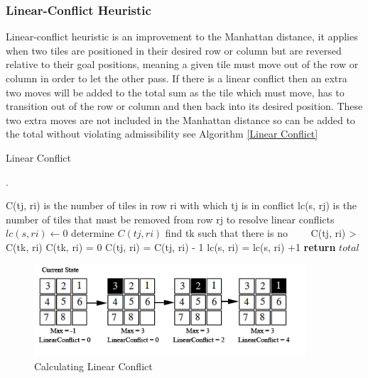 \documentclass[final]{cmpreport}
\begin{document}
\subsubsection{Linear-Conflict Heuristic}
Linear-conflict heuristic is an improvement to the Manhattan distance, it applies when two tiles are positioned in their desired row or column but are reversed relative to
their goal positions, meaning a given tile must move out of the row or column in order to let the other pass. If there is a linear conflict then an extra two moves will be added to the total sum as the tile which must move, has to transition out of the row or column and then back into its desired position. These two extra moves are not included in the Manhattan distance so can be added to the total without violating admissibility see Algorithm \ref{Linear Conflict} 


\begin{algorithm}
	\caption{Linear Conflict}\label{Linear Conflict}\cite{hansson1992criticizing}.
	\begin{algorithmic}[1]
		\State C(tj, ri) is the number of tiles in row ri with which tj is in conflict
		\State lc(s, rj) is the number of tiles that must be removed from row rj to resolve linear conflicts
			
			\State $lc(s, ri)\gets 0$
				\State determine $C(tj, ri)$
					\State find tk such that there is no
					\State \ \ \ \  C(tj, ri) > C(tk, ri)
					\State C(tk, ri) = 0 
						\State C(tj, ri) = C(tj, ri) - 1 
					\EndFor
					\State lc(s, ri) = lc(s, ri) +1	
				\EndWhile
			\EndFor
		\EndFor
		\State \textbf{return} $total$
		\EndProcedure
	\end{algorithmic}
\end{algorithm}


\begin{figure}[ht]
	\centering
	\includegraphics[width=0.9\textwidth]{linear}
	\captionsetup{justification=centering}
	\caption{Calculating Linear Conflict}
\end{figure}
\end{document}
